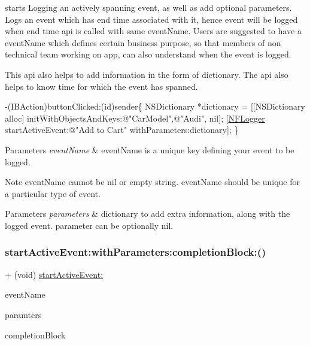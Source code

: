 starts Logging an actively spanning event, as well as add optional parameters. Logs an event which has end time associated with it, hence event will be logged when end time api is called with same event\+Name. Users are suggested to have a event\+Name which defines certain business purpose, so that members of non technical team working on app, can also understand when the event is logged. 

This api also helps to add information in the form of dictionary. The api also helps to know time for which the event has spanned.


\begin{DoxyCode}
-(IBAction)buttonClicked:(\textcolor{keywordtype}{id})sender\{
 NSDictionary *dictionary = [[NSDictionary alloc] initWithObjectsAndKeys:\textcolor{stringliteral}{@"CarModel"},\textcolor{stringliteral}{@"Audi"}, nil];
 [\hyperlink{interface_n_f_logger}{NFLogger} startActiveEvent:\textcolor{stringliteral}{@"Add to Cart"} withParameters:dictionary];
\}
\end{DoxyCode}
 
\begin{DoxyParams}{Parameters}
{\em event\+Name} & event\+Name is a unique key defining your event to be logged. \\
\hline
\end{DoxyParams}
\begin{DoxyNote}{Note}
event\+Name cannot be nil or empty string. event\+Name should be unique for a particular type of event. 
\end{DoxyNote}

\begin{DoxyParams}{Parameters}
{\em parameters} & dictionary to add extra information, along with the logged event. parameter can be optionally nil. \\
\hline
\end{DoxyParams}
\mbox{\label{interface_n_f_logger_a943cd3b2d89a9b40f9bb2540d8fcd190}} 
\subsubsection{\texorpdfstring{start\+Active\+Event\+:with\+Parameters\+:completion\+Block\+:()}{startActiveEvent:withParameters:completionBlock:()}}
{\footnotesize\ttfamily + (void) \hyperlink{interface_n_f_logger_a2d98749d91d892500fab101747d06a71}{start\+Active\+Event\+:} \begin{DoxyParamCaption}\item[{(N\+S\+String $\ast$)}]{event\+Name }\item[{withParameters:(N\+S\+Dictionary $\ast$)}]{paramters }\item[{completionBlock:(void($^\wedge$)(N\+F\+L\+O\+G\+Record\+Status record\+Status))}]{completion\+Block }\end{DoxyParamCaption}}



